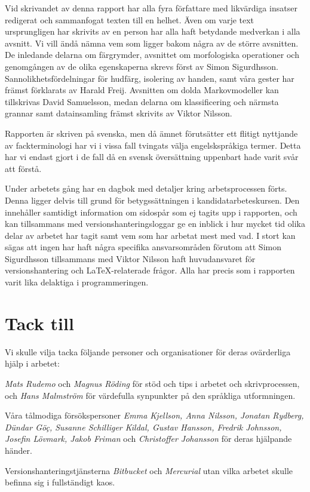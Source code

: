 \documentclass[../rapport_MVEX01-11-05]{subfiles}
\begin{document}
Vid skrivandet av denna rapport har alla fyra författare 
med likvärdiga insatser redigerat och sammanfogat
texten till en helhet. Även om varje text ursprungligen har skrivits av en
person har alla haft betydande medverkan i alla avsnitt.
Vi vill ändå nämna vem som ligger bakom några av de större avsnitten.
De inledande delarna om färgrymder, avsnittet om morfologiska operationer
och genomgången av de olika egenskaperna skrevs först av Simon Sigurdhsson.
Sannolikhetsfördelningar för hudfärg, isolering av handen, samt våra gester
har främst förklarats av Harald Freij.
Avsnitten om dolda Markovmodeller kan tillskrivas David Samuelsson, medan
delarna om klassificering och närmsta grannar samt datainsamling främst skrivits av Viktor Nilsson.

Rapporten är skriven på svenska, men då ämnet förutsätter ett flitigt nyttjande
av fackterminologi har vi i vissa fall tvingats välja engelskspråkiga termer.
Detta har vi endast gjort i de fall då en svensk översättning uppenbart hade
varit svår att förstå.

Under arbetets gång har en dagbok med detaljer kring arbetsprocessen
förts. Denna ligger delvis till grund för betygssättningen i
kandidatarbeteskursen. Den innehåller samtidigt information om sidospår som ej
tagits upp i rapporten, och kan tillsammans med versionshanteringsloggar ge
en inblick i hur mycket tid olika delar av arbetet har tagit samt vem som har
arbetat mest med vad. I stort kan sägas att ingen har haft några specifika
ansvarsområden förutom att Simon Sigurdhsson tillsammans med Viktor
Nilsson haft huvudansvaret för versionshantering och \LaTeX-relaterade frågor.
Alla har precis som i rapporten varit lika delaktiga i programmeringen.

\cleardoublepage
\section*{Tack till}
Vi skulle vilja tacka följande personer och organisationer för deras
ovärderliga hjälp i arbetet:

\begin{list}{}{\leftmargin=1em\rightmargin=1em}
\item \emph{Mats Rudemo} och \emph{Magnus Röding} för stöd och tips i arbetet
och skrivprocessen, och
\emph{Hans Malmström} för värdefulla synpunkter på den språkliga utformningen.

\item Våra tålmodiga försökspersoner \emph{Emma Kjellson, Anna Nilsson,
Jonatan Rydberg, Dündar Göç, Susanne Schilliger Kildal, Gustav Hansson,
Fredrik Johnsson, Josefin Lövmark, Jakob Friman} och \emph{Christoffer
Johansson} för deras hjälpande händer.

\item Versionshanteringstjänsterna \emph{Bitbucket} och \emph{Mercurial} utan vilka
arbetet skulle befinna sig i fullständigt kaos.
\end{list}
\end{document}
